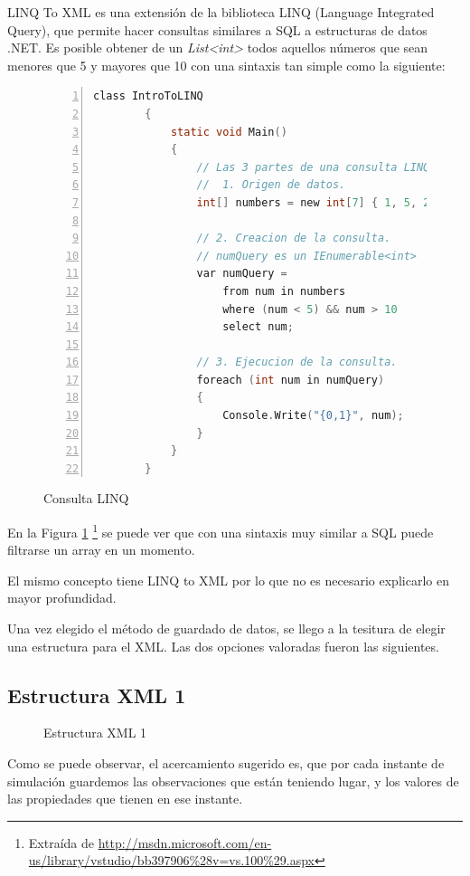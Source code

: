 LINQ To XML es una extensi\'on de la biblioteca LINQ (Language Integrated Query), que permite hacer consultas
similares a SQL a estructuras de datos .NET. Es posible obtener de un \emph{List<int>} todos aquellos n\'umeros
que sean menores que 5 y mayores que 10 con una sintaxis tan simple como la siguiente:

\begin{figure}[H]
	\begin{lstlisting}[tabsize=2, language=C, numbers=left, showspaces=false, breaklines=true]
		class IntroToLINQ
		{        
			static void Main()
			{
				// Las 3 partes de una consulta LINQ:
				//  1. Origen de datos.
				int[] numbers = new int[7] { 1, 5, 20, -4, 7, 8, 9};
				
				// 2. Creacion de la consulta.
				// numQuery es un IEnumerable<int>
				var numQuery =
					from num in numbers
					where (num < 5) && num > 10
					select num;
				
				// 3. Ejecucion de la consulta.
				foreach (int num in numQuery)
				{
					Console.Write("{0,1}", num);
				}
			}
		}
	\end{lstlisting}
	\caption[Consulta LINQ]{Consulta LINQ}
	\label{Consulta LINQ}
\end{figure}

En la Figura \ref{Consulta LINQ}
\footnote{Extra\'ida de \url{http://msdn.microsoft.com/en-us/library/vstudio/bb397906\%28v=vs.100\%29.aspx}}
se puede ver que con una sintaxis muy similar a SQL puede filtrarse un array en un momento.

El mismo concepto tiene LINQ to XML por lo que no es necesario explicarlo en mayor profundidad.

Una vez elegido el m\'etodo de guardado de datos, se llego a la tesitura de elegir una estructura para el XML.
Las dos opciones valoradas fueron las siguientes.

\subsection{Estructura XML 1}
\begin{figure}[H]
	
	\caption[Estructura XML 1]{Estructura XML 1}
	\label{Estructura XML1}
\end{figure}


Como se puede observar, el acercamiento sugerido es, que por cada instante de simulaci\'{o}n guardemos las observaciones que 
est\'{a}n teniendo lugar,
y los valores de las propiedades que tienen en ese instante.

